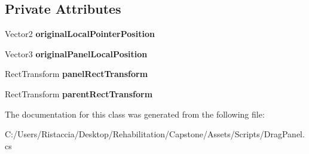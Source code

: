 \subsection*{Private Attributes}
\begin{DoxyCompactItemize}
\item 
\mbox{\label{class_drag_panel_aebea51060f0e4a78488b3c982ccbdba8}} 
Vector2 {\bfseries original\+Local\+Pointer\+Position}
\item 
\mbox{\label{class_drag_panel_a2e91bdc728af308a64014c99adccbe9c}} 
Vector3 {\bfseries original\+Panel\+Local\+Position}
\item 
\mbox{\label{class_drag_panel_adefb044dc1405f897ccea16324427a69}} 
Rect\+Transform {\bfseries panel\+Rect\+Transform}
\item 
\mbox{\label{class_drag_panel_a390c6b2f7160cb56af303ce96381c6ea}} 
Rect\+Transform {\bfseries parent\+Rect\+Transform}
\end{DoxyCompactItemize}


The documentation for this class was generated from the following file\+:\begin{DoxyCompactItemize}
\item 
C\+:/\+Users/\+Ristaccia/\+Desktop/\+Rehabilitation/\+Capstone/\+Assets/\+Scripts/Drag\+Panel.\+cs\end{DoxyCompactItemize}
